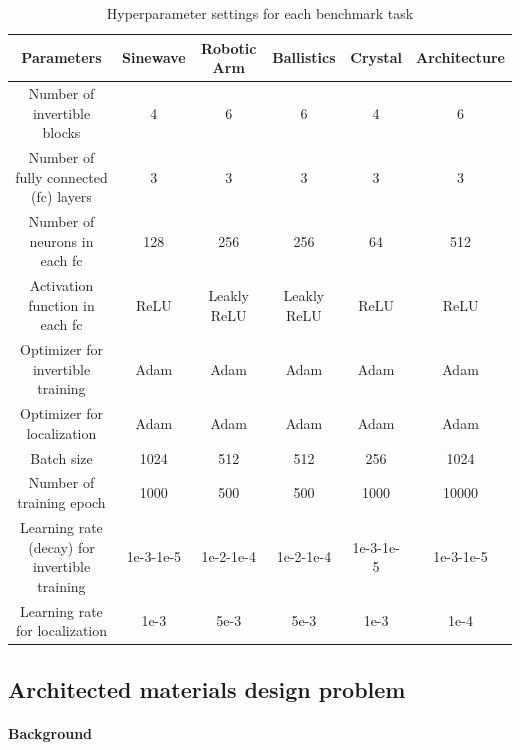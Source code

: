 \documentclass[letterpaper]{article} %
\begin{document}
\begin{table}[!h]  
\centering
\caption{Hyperparameter settings for each benchmark task} 
\label{tab:setting}
\begin{tabular}{@{}cccccc@{}}
\toprule
Parameters                              & Sinewave  & Robotic Arm & Ballistics  & Crystal  & Architecture  \\ \midrule
Number of invertible blocks             & 4         & 6           & 6           & 4  & 6       \\
Number of fully connected (fc)   layers & 3         & 3           & 3           & 3  & 3       \\
Number of neurons in each fc            & 128       & 256         & 256         & 64  & 512       \\
Activation function in each fc          & ReLU      & Leakly ReLU & Leakly ReLU & ReLU  & ReLU    \\
Optimizer for invertible training                               & Adam      & Adam        & Adam        & Adam & Adam      \\
Optimizer for localization                               & Adam      & Adam        & Adam        & Adam & Adam     \\
Batch size                              & 1024      & 512         & 512         & 256  & 1024      \\
Number of training epoch                & 1000      & 500         & 500         & 1000 & 10000     \\
Learning rate (decay) for invertible training                   & 1e-3-1e-5 & 1e-2-1e-4   & 1e-2-1e-4   & 1e-3-1e-5 & 1e-3-1e-5 \\
Learning rate for localization                   & 1e-3 & 5e-3   & 5e-3   & 1e-3 & 1e-4 \\ \bottomrule
\end{tabular}
\end{table}

\subsection{Architected materials design problem}
\paragraph{Background}
\end{document}
